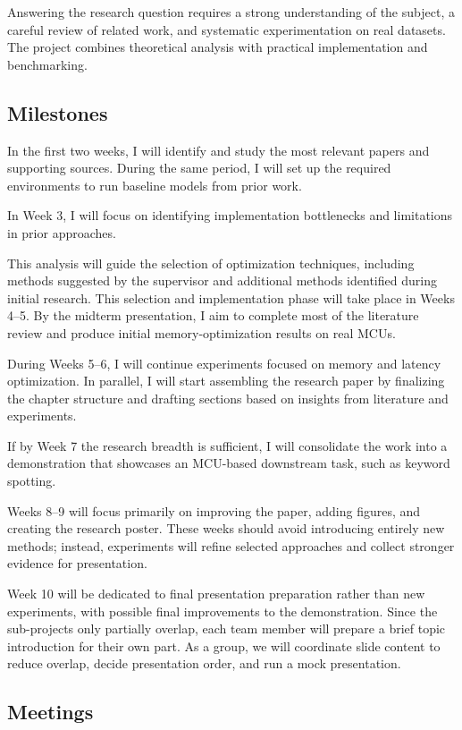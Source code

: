 \documentclass[english, a4paper]{article}
\begin{document}
Answering the research question requires a strong understanding of the subject, a careful review of related work, and systematic experimentation on real datasets. The project combines theoretical analysis with practical implementation and benchmarking.

\subsection*{Milestones}
In the first two weeks, I will identify and study the most relevant papers and supporting sources. During the same period, I will set up the required environments to run baseline models from prior work.

In Week 3, I will focus on identifying implementation bottlenecks and limitations in prior approaches.

This analysis will guide the selection of optimization techniques, including methods suggested by the supervisor and additional methods identified during initial research. This selection and implementation phase will take place in Weeks 4--5. By the midterm presentation, I aim to complete most of the literature review and produce initial memory-optimization results on real MCUs.

During Weeks 5--6, I will continue experiments focused on memory and latency optimization. In parallel, I will start assembling the research paper by finalizing the chapter structure and drafting sections based on insights from literature and experiments.

If by Week 7 the research breadth is sufficient, I will consolidate the work into a demonstration that showcases an MCU-based downstream task, such as keyword spotting.

Weeks 8--9 will focus primarily on improving the paper, adding figures, and creating the research poster. These weeks should avoid introducing entirely new methods; instead, experiments will refine selected approaches and collect stronger evidence for presentation.

Week 10 will be dedicated to final presentation preparation rather than new experiments, with possible final improvements to the demonstration. Since the sub-projects only partially overlap, each team member will prepare a brief topic introduction for their own part. As a group, we will coordinate slide content to reduce overlap, decide presentation order, and run a mock presentation.

\subsection*{Meetings}
\end{document}
